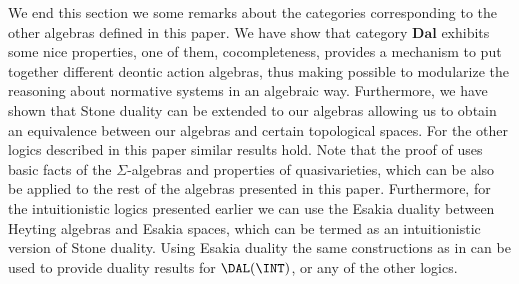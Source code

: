 We end this section we some remarks about the categories corresponding to the other algebras defined in this paper. We have show that category $\mathbf{Dal}$ exhibits some nice properties, one of them, cocompleteness, provides a mechanism to put together different deontic action algebras, thus making possible to modularize the reasoning about normative systems in an algebraic way.  Furthermore,   we have shown that Stone duality can be extended to our algebras allowing us to obtain an equivalence between our algebras and certain topological spaces.  For the other logics described in this paper similar results hold.  Note that the proof of   uses basic facts of the $\Sigma$-algebras and properties of quasivarieties,  which can be also be applied to the rest of the algebras presented in this paper.  Furthermore,  for the intuitionistic logics presented earlier we can use the Esakia duality \cite{Esakia19} between Heyting algebras and Esakia spaces, which can be termed as an intuitionistic version of Stone duality. Using Esakia duality the same constructions as in  can be used to provide duality results for $\DAL(\INT)$,  or any of the other logics. 




